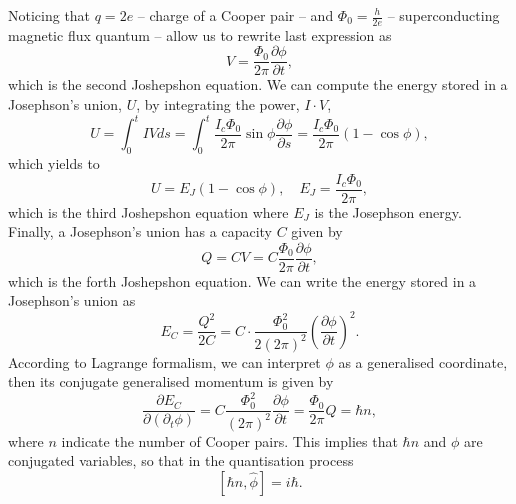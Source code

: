 Noticing that $q=2e$ -- charge of a Cooper pair -- and $\Phi_{0} = \frac{h}{2e}$ -- superconducting magnetic flux quantum --  allow us to rewrite last expression as
\begin{equation}
V = \frac{\Phi_{0}}{2\pi}\frac{\partial \phi}{\partial t},
\end{equation}
which is the second Joshepshon equation. We can compute the energy stored in a Josephson's union, $U$, by integrating the power, $I\cdot V$,
\begin{equation}
U = \int_{0}^{t}IVds = \int_{0}^{t}\frac{I_{c}\Phi_{0}}{2\pi}\sin{\phi}\frac{\partial \phi}{\partial s} = \frac{I_{c}\Phi_{0}}{2\pi}\left(1-\cos{\phi}\right),
\end{equation}
which yields to
\begin{equation}
U = E_{J}\left(1-\cos{\phi}\right), \quad E_{J} = \frac{I_{c}\Phi_{0}}{2\pi},
\end{equation}
which is the third Joshepshon equation where $E_{J}$ is the Josephson energy.
Finally, a Josephson's union has a capacity $C$ given by
\begin{equation}
Q = CV = C \frac{\Phi_{0}}{2\pi}\frac{\partial \phi}{\partial t},
\end{equation}
which is the forth Joshepshon equation. We can write the energy stored in a Josephson's union as
\begin{equation}
E_{C} = \frac{Q^{2}}{2C} = C\cdot \frac{\Phi_{0}^{2}}{2\left(2\pi\right)^{2}}\left(\frac{\partial \phi}{\partial t}\right)^{2}.
\end{equation}
According to Lagrange formalism, we can interpret $\phi$ as a generalised coordinate, then its conjugate generalised momentum is given by
\begin{equation}
\frac{\partial E_{C}}{\partial \left(\partial_{t}\phi\right)} = C \frac{\Phi_{0}^{2}}{\left(2\pi\right)^{2}}\frac{\partial \phi}{\partial t} = \frac{\Phi_{0}}{2\pi}Q = \hbar n,
\end{equation}
where $n$ indicate the number of Cooper pairs. This implies that $\hbar n$ and $\phi$ are conjugated variables, so that in the quantisation process
\begin{equation}
\left[\hbar \hat{n},\hat{\phi}\right] = i\hbar.
\end{equation}
